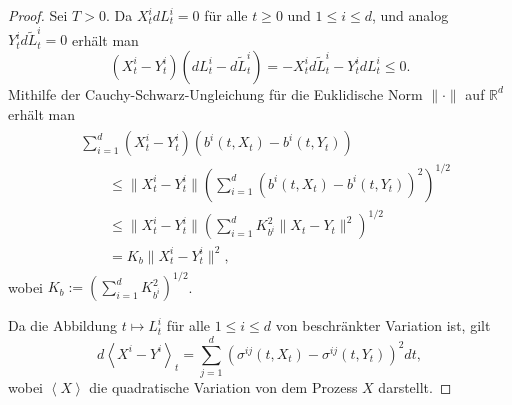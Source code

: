 \documentclass[10pt, a4paper, leqno, twoside, bibliography=totocnumbered, final]{scrartcl}
\theoremstyle{definition}
\theoremstyle{plain}%
\theoremstyle{remark}
\begin{document}
\begin{proof}
Sei $ T>0 $. Da $  X^i_t dL^i_t = 0 $ für alle $ t \geq 0 $ und $ 1 \leq i \leq d $, und analog $  Y^i_t d\tilde{L}^i_t = 0 $  erhält man
\begin{equation}
\label{sec:hilfe1}
\left( X^i_t - Y^i_t \right) \left( dL^i_t - d\tilde{L}^i_t \right) = - X^i_t d\tilde{L}^i_t - Y^i_t  dL^i_t \leq 0.
\end{equation}
Mithilfe der Cauchy-Schwarz-Ungleichung für die Euklidische Norm $ \| \cdot \| $ auf $ \mathbb{R}^d $ erhält man
\begin{align}
\begin{split}
\label{sec:hilfe2}
& \sum_{i = 1}^{d} \left( X^i_t - Y^i_t \right) \left( b^i(t,X_t) - b^i(t, Y_t) \right) \\
& \qquad \leq \|  X^i_t - Y^i_t \| \left( \sum_{i = 1}^{d} \left( b^i(t,X_t) - b^i(t, Y_t) \right)^2 \right)^{1/2} \\
& \qquad \leq \|  X^i_t - Y^i_t \| \left( \sum_{i = 1}^{d} K_{b^i}^2 \| X_t - Y_t \|^2 \right)^{1/2} \\
& \qquad = K_b \|  X^i_t - Y^i_t \|^2, 
\end{split}
\end{align}
wobei $ K_b := \left( \sum_{i=1}^d K_{b^i}^2 \right)^{1/2} $.

Da die Abbildung $ t \mapsto L^i_t $ für alle $ 1 \leq i \leq d $ von beschränkter Variation ist, gilt
\begin{equation}
\label{sec:hilfe3}
d \left\langle X^i - Y^i \right\rangle_t = \sum_{j = 1}^d \left( \sigma^{ij}(t,X_t) - \sigma^{ij}(t,Y_t) \right)^2 dt,
\end{equation}
wobei $ \left\langle X \right\rangle $ die quadratische Variation von dem Prozess $ X $ darstellt.


\end{proof}
\end{document}
